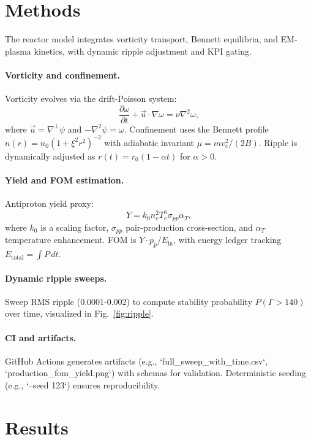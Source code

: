 \documentclass[11pt]{article}
\begin{document}
\section{Methods}
The reactor model integrates vorticity transport, Bennett equilibria, and EM-plasma kinetics, with dynamic ripple adjustment and KPI gating.

\paragraph{Vorticity and confinement.} Vorticity evolves via the drift-Poisson system:
\begin{equation}
\frac{\partial \omega}{\partial t} + \vec{u} \cdot \nabla \omega = \nu \nabla^2 \omega,
\end{equation}
where $\vec{u} = \nabla^\perp \psi$ and $-\nabla^2 \psi = \omega$. Confinement uses the Bennett profile $n(r)=n_0 (1 + \xi^2 r^2)^{-2}$ with adiabatic invariant $\mu = m v_c^2 / (2B)$. Ripple is dynamically adjusted as $r(t) = r_0 (1 - \alpha t)$ for $\alpha > 0$.

\paragraph{Yield and FOM estimation.} Antiproton yield proxy:
\begin{equation}
Y = k_0 n_e^2 T_e^6 \sigma_{pp} \alpha_T,
\end{equation}
where $k_0$ is a scaling factor, $\sigma_{pp}$ pair-production cross-section, and $\alpha_T$ temperature enhancement. FOM is $Y \cdot p_{\bar{p}} / E_{\text{in}}$, with energy ledger tracking $E_{\text{total}} = \int P \, dt$.

\paragraph{Dynamic ripple sweeps.} Sweep RMS ripple (0.0001-0.002) to compute stability probability $P(\Gamma > 140)$ over time, visualized in Fig.~\ref{fig:ripple}.

\paragraph{CI and artifacts.} GitHub Actions generates artifacts (e.g., `full_sweep_with_time.csv`, `production_fom_yield.png`) with schemas for validation. Deterministic seeding (e.g., `--seed 123`) ensures reproducibility.

\section{Results}
\end{document}
